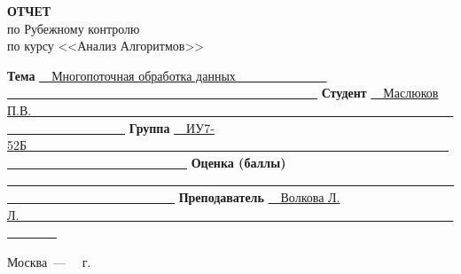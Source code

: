 \begin{titlepage}
\begin{center}
	\textbf{\large ОТЧЕТ} \\
	\large по Рубежному контролю\\
	по курсу <<Анализ Алгоритмов>>
\end{center}

	
	\noindent\textbf{Тема} \underline{~~Многопоточная обработка данных   ~~~~~~~~~~~~~~ ~~~~~~~~~~~~~~~~~~~~~~~~~~~~~~~~~~~~~~~~~~~~~~~~~~}\newline\newline
	\noindent\textbf{Студент} \underline{~~Маслюков П.В.~~~~~~~~~~~~~~~~~~~~~~~~~~~~~~~~~~~~~~~~~~~~~~~~~~~~~~~~~~~~~~~~~~~~~~~~~~~~~~~~~~~~~~~}\newline\newline
	\noindent\textbf{Группа} \underline{~~ИУ7-52Б~~~~~~~~~~~~~~~~~~~~~~~~~~~~~~~~~~~~~~~~~~~~~~~~~~~~~~~~~~~~~~~~~~~~~~~~~~~~~~~~~~~~~~~~~~~~~~~~~}\newline\newline
	\noindent\textbf{Оценка (баллы)} \underline{~~~~~~~~~~~~~~~~~~~~~~~~~~~~~~~~~~~~~~~~~~~~~~~~~~~~~~~~~~~~~~~~~~~~~~~~~~~~~~~~~~~~~~~~~~~~~~~~~~~}\newline\newline
	\noindent\textbf{Преподаватель} \underline{~~Волкова Л. Л.~~~~~~~~~~~~~~~~~~~~~~~~~~~~~~~~~~~~~~~~~~~~~~~~~~~~~~~~~~~~~~~~~~~~~~~~~~~~~~}\newline
	
	\begin{center}
		\vfill
		Москва~---~\the\year
		~г.
	\end{center}
 
    \restoregeometry
    
\end{titlepage}
